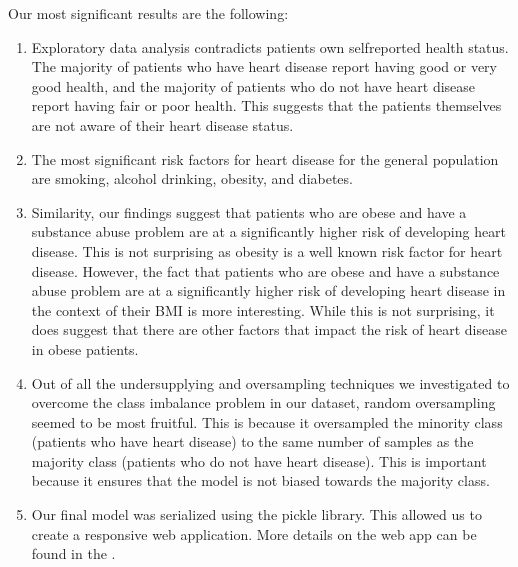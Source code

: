\documentclass[letterpaper,10pt,english]{jupyterBook}
\begin{document}
\sphinxAtStartPar
Our most significant results are the following:
\begin{enumerate}
%
\item {} 
\sphinxAtStartPar
Exploratory data analysis contradicts  patients own self\sphinxhyphen{}reported health status. The majority of patients who have heart disease report having good or very good health, and the majority of patients who do not have heart disease report having fair or poor health. This suggests that the patients themselves are not aware of their heart disease status.

\item {} 
\sphinxAtStartPar
The most significant risk factors for heart disease for the general population are smoking, alcohol drinking, obesity, and diabetes.

\item {} 
\sphinxAtStartPar
Similarity, our findings suggest that patients who are obese and have a substance abuse problem are at a significantly higher risk of developing heart disease. This is not surprising as obesity is a well known risk factor for heart disease. However, the fact that patients who are obese and have a substance abuse problem are at a significantly higher risk of developing heart disease in the context of their BMI is more interesting. While this is not surprising, it does suggest that there are other factors that impact the risk of heart disease in obese patients.

\item {} 
\sphinxAtStartPar
Out of all the undersupplying and oversampling techniques we investigated to overcome the class imbalance problem in our dataset, random oversampling seemed to be most fruitful. This is because it oversampled the minority class (patients who have heart disease) to the same number of samples as the majority class (patients who do not have heart disease). This is important because it ensures that the model is not biased towards the majority class.

\item {} 
\sphinxAtStartPar
Our final model was serialized using the  pickle library. This allowed us to create a responsive web application. More details on the web app can be found in the .

\end{enumerate}
\end{document}

